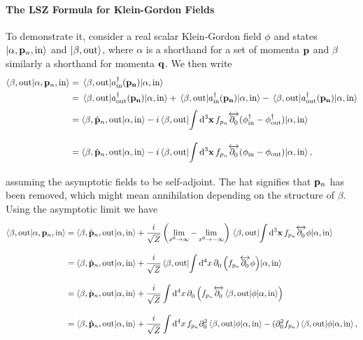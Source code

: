 \paragraph{The LSZ Formula for Klein-Gordon Fields}
To demonstrate it, consider a real scalar Klein-Gordon field $\phi$ and states $\ket{\alpha, \vb{p}_{n}, \text{in}}$ and $\ket{\beta, \text{out}}$, where $\alpha$ is a shorthand for a set of momenta $\vb{p}$ and $\beta$ similarly a shorthand for momenta $\vb{q}$. We then write
\begin{align*}
	\braket{\beta, \text{out}}{\alpha, \vb{p}_{n}, \text{in}} &= \mel{\beta, \text{out}}{a_{\text{in}}\ensuremath{^{\dagger}}(\vb{p_{n}})}{\alpha, \text{in}} \\
	&= \mel{\beta, \text{out}}{a_{\text{out}}\ensuremath{^{\dagger}}(\vb{p_{n}})}{\alpha, \text{in}} + \mel{\beta, \text{out}}{a_{\text{in}}\ensuremath{^{\dagger}}(\vb{p_{n}})}{\alpha, \text{in}} - \mel{\beta, \text{out}}{a_{\text{out}}\ensuremath{^{\dagger}}(\vb{p_{n}})}{\alpha, \text{in}} \\
	&= \braket{\beta, \hat{\vb{p}}_{n}, \text{out}}{\alpha, \text{in}} - i\mel{\beta, \text{out}}{\int\limits_{}^{}\dd[3]{\vb{x}}f_{p_{n}}\ensuremath{\overleftrightarrow{\partial^{}_{0}}}(\phi_{\text{in}}\ensuremath{^{\dagger}}- \phi_{\text{out}}\ensuremath{^{\dagger}})}{\alpha, \text{in}} \\
	&= \braket{\beta, \hat{\vb{p}}_{n}, \text{out}}{\alpha, \text{in}} - i\mel{\beta, \text{out}}{\int\limits_{}^{}\dd[3]{\vb{x}}f_{p_{n}}\ensuremath{\overleftrightarrow{\partial^{}_{0}}}(\phi_{\text{in}} - \phi_{\text{out}})}{\alpha, \text{in}},
\end{align*}
assuming the asymptotic fields to be self-adjoint. The hat signifies that $\vb{p}_{n}$ has been removed, which might mean annihilation depending on the structure of $\beta$. Using the asymptotic limit we have
\begin{align*}
	\braket{\beta, \text{out}}{\alpha, \vb{p}_{n}, \text{in}} &= \braket{\beta, \hat{\vb{p}}_{n}, \text{out}}{\alpha, \text{in}} + \frac{i}{\sqrt{Z}}\left(\lim\limits_{x^{0} \to \infty} - \lim\limits_{x^{0} \to -\infty}\right)\mel{\beta, \text{out}}{\int\limits_{}^{}\dd[3]{\vb{x}}f_{p_{n}}\ensuremath{\overleftrightarrow{\partial^{}_{0}}}\phi}{\alpha, \text{in}} \\
	&= \braket{\beta, \hat{\vb{p}}_{n}, \text{out}}{\alpha, \text{in}} + \frac{i}{\sqrt{Z}}\mel{\beta, \text{out}}{\int\limits_{}^{}\dd[4]{x}\ensuremath{\partial^{}_{0}}\left(f_{p_{n}}\ensuremath{\overleftrightarrow{\partial^{}_{0}}}\phi\right)}{\alpha, \text{in}} \\
	&= \braket{\beta, \hat{\vb{p}}_{n}, \text{out}}{\alpha, \text{in}} + \frac{i}{\sqrt{Z}}\int\limits_{}^{}\dd[4]{x}\partial^{}_{0}\left(f_{p_{n}}\overleftrightarrow{\partial^{}_{0}}\mel{\beta, \text{out}}{\phi}{\alpha, \text{in}}\right) \\
	&= \braket{\beta, \hat{\vb{p}}_{n}, \text{out}}{\alpha, \text{in}} + \frac{i}{\sqrt{Z}}\int\limits_{}^{}\dd[4]{x}f_{p_{n}}\partial^{2}_{0}\mel{\beta, \text{out}}{\phi}{\alpha, \text{in}} - (\partial^{2}_{0}f_{p_{n}})\mel{\beta, \text{out}}{\phi}{\alpha, \text{in}},
\end{align*}
